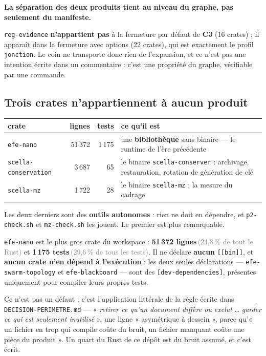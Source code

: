 \documentclass[10pt]{report}
\newcommand{\code}[1]{\texttt{\small #1}}
\newcommand{\ctrois}{\textcolor{c3col}{\textbf{C3}}}
\newcommand{\mesure}[2]{\textbf{#1}\,\footnotesize\textcolor{grey}{(#2)}\normalsize}
\begin{document}
\begin{acquis}
\textbf{La séparation des deux produits tient au niveau du graphe, pas seulement du manifeste.}

\code{reg-evidence} \textbf{n'appartient pas} à la fermeture par défaut de \ctrois{} (16 crates) ; il
apparaît dans la fermeture avec options (22 crates), qui est exactement le profil \code{jonction}. Le
coin ne transporte donc rien de l'expansion, et ce n'est pas une intention écrite dans un
commentaire : c'est une propriété du graphe, vérifiable par une commande.
\end{acquis}

\subsection{Trois crates n'appartiennent à aucun produit}

\begin{longtable}{@{}p{4.4cm}r r p{7.6cm}@{}}
\toprule \textbf{crate} & \textbf{lignes} & \textbf{tests} & \textbf{ce qu'il est} \\ \midrule \endhead
\code{efe-nano} & 51\,372 & 1\,175 & une \textbf{bibliothèque} sans binaire --- le runtime de l'ère précédente \\
\code{scella-conservation} & 3\,687 & 65 & le binaire \code{scella-conserver} : archivage, restauration, rotation de génération de clé \\
\code{scella-mz} & 1\,722 & 28 & le binaire \code{scella-mz} : la mesure du cadrage \\
\bottomrule
\end{longtable}

Les deux derniers sont des \textbf{outils autonomes} : rien ne doit en dépendre, et
\code{p2-check.sh} et \code{mz-check.sh} les jouent. Le premier est plus remarquable.

\begin{alerte}
\code{efe-nano} est le plus gros crate du workspace : \mesure{51\,372 lignes}{24{,}8\,\% de tout le
Rust} et \mesure{1\,175 tests}{29{,}6\,\% de tous les tests}. Il ne déclare \textbf{aucun}
\code{[[bin]]}, et \textbf{aucun crate n'en dépend à l'exécution} : les deux seules déclarations ---
\code{efe-swarm-topology} et \code{efe-blackboard} --- sont des \code{[dev-dependencies]}, présentes
uniquement pour compiler leurs propres tests.

Ce n'est pas un défaut : c'est l'application littérale de la règle écrite dans
\code{DECISION-PERIMETRE.md} --- « \emph{retirer ce qu'un document diffère ou exclut} \ldots
\emph{garder ce qui est seulement inutilisé} », une ligne « asymétrique à dessein », parce qu'« un
fichier en trop qui compile coûte du bruit, un fichier manquant coûte une pièce du produit ». Un quart
du Rust de ce dépôt est du bruit assumé, et c'est écrit.
\end{alerte}
\end{document}
